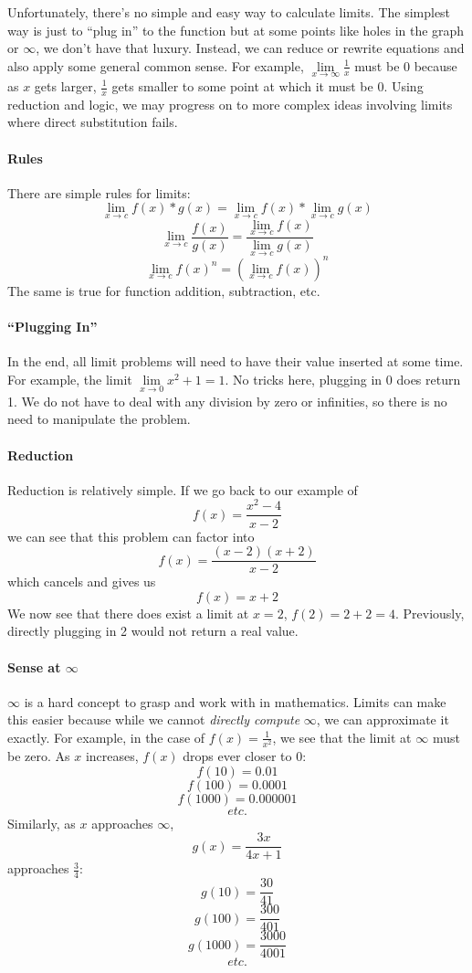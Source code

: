 \documentclass[../revisedMain.tex]{subfiles}
\begin{document}
Unfortunately, there's no simple and easy way to calculate limits. The simplest way is just to ``plug in'' to the function but at some points like holes in the graph or $\infty$, we don't have that luxury. Instead, we can reduce or rewrite equations and also apply some general common sense. For example, $\lim\limits_{x\to\infty} \frac{1}{x}$ must be 0 because as $x$ gets larger, $\frac{1}{x}$ gets smaller to some point at which it must be 0. Using reduction and logic, we may progress on to more complex ideas involving limits where direct substitution fails.
\paragraph{Rules} There are simple rules for limits: $$\lim_{x\to c} f(x)*g(x) = \lim_{x\to c} f(x) * \lim_{x\to c} g(x)$$$$\lim_{x\to c} \frac{f(x)}{g(x)} = \frac{\lim\limits_{x\to c} f(x)}{\lim\limits_{x\to c} g(x)}$$$$\lim_{x\to c} f(x)^n = (\lim_{x\to c} f(x))^n$$
The same is true for function addition, subtraction, etc.
\paragraph{``Plugging In''} In the end, all limit problems will need to have their value inserted at some time. For example, the limit $\lim\limits_{x\to 0} x^2+1=1$. No tricks here, plugging in 0 does return 1. We do not have to deal with any division by zero or infinities, so there is no need to manipulate the problem.
\paragraph{Reduction} Reduction is relatively simple. If we go back to our example of $$f(x)=\frac{x^2-4}{x-2}$$ we can see that this problem can factor into $$f(x)=\frac{(x-2)(x+2)}{x-2}$$ which cancels and gives us $$f(x)=x+2$$We now see that there does exist a limit at $x=2$, $f(2)=2+2=4$. Previously, directly plugging in 2 would not return a real value.
\paragraph{Sense at $\infty$} $\infty$ is a hard concept to grasp and work with in mathematics. Limits can make this easier because while we cannot \textit{directly compute} $\infty$, we can approximate it exactly. For example, in the case of $f(x)=\frac{1}{x^2}$, we see that the limit at $\infty$ must be zero. As $x$ increases, $f(x)$ drops ever closer to 0:$$f(10)=0.01$$$$f(100)=0.0001$$$$f(1000)=0.000001$$$$etc.$$ Similarly, as $x$ approaches $\infty$, $$g(x)=\frac{3x}{4x+1}$$ approaches $\frac{3}{4}$: $$g(10)=\frac{30}{41}$$$$g(100)=\frac{300}{401}$$$$g(1000)=\frac{3000}{4001}$$$$etc.$$
\end{document}
